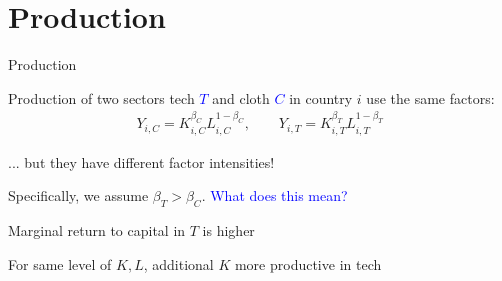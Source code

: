 \documentclass[notes,11pt, aspectratio=169, xcolor=table]{beamer}
\newcommand{\blue}[1]{\textcolor{blue}{#1}}
\newenvironment{wideitemize}{\itemize\addtolength{\itemsep}{10pt}}{\enditemize}
\begin{document}
\section{Production}

\begin{frame}{Production}

    \begin{wideitemize}

        \item<1-> Production of two sectors tech \blue{$T$} and cloth \blue{$C$} in country $i$ use the same factors:
        \begin{eqnarray*}\label{eq: production}
         Y_{i,C} = K_{i,C}^{\beta_C} L_{i,C}^{1-\beta_C}, \qquad  Y_{i,T} = K_{i,T}^{\beta_T} L_{i,T}^{1-\beta_T}
        \end{eqnarray*}

        \item<2-> ... but they have different factor intensities!
        \item<3-> Specifically, we assume $\beta_T > \beta_C$. \blue{What does this mean?}
        \item<4-> Marginal return to capital in $T$ is higher
        \item<5-> For same level of $K,L$, additional $K$ more productive in tech
    \end{wideitemize}
\end{frame}
\end{document}
